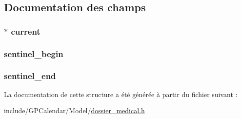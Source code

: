 \subsection{Documentation des champs}
\hypertarget{struct_list_antecedent_a93d09acaf5d014c14988d6a2b03cb6c3}{
\subsubsection[{current}]{$\ast$ current}}\label{struct_list_antecedent_a93d09acaf5d014c14988d6a2b03cb6c3}
\hypertarget{struct_list_antecedent_a2aa9bf6f515609f5be242be5c329e78b}{
\subsubsection[{sentinel\-\_\-begin}]{ sentinel\-\_\-begin}}\label{struct_list_antecedent_a2aa9bf6f515609f5be242be5c329e78b}
\hypertarget{struct_list_antecedent_a7f9cde4039bce42b1cdf76bb41731bb4}{
\subsubsection[{sentinel\-\_\-end}]{ sentinel\-\_\-end}}\label{struct_list_antecedent_a7f9cde4039bce42b1cdf76bb41731bb4}


La documentation de cette structure a été générée à partir du fichier suivant \-:\begin{DoxyCompactItemize}
\item 
include/\-G\-P\-Calendar/\-Model/\hyperlink{dossier__medical_8h}{dossier\-\_\-medical.\-h}\end{DoxyCompactItemize}
